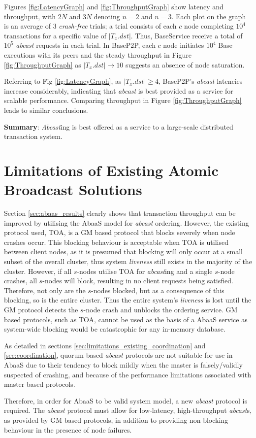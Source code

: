 Figures \ref{fig:LatencyGraph} and \ref{fig:ThroughputGraph} show latency and throughput, with $2N$ and $3N$ denoting $n=2$ and $n=3$. Each plot on the graph is an average of 3 \emph{crash-free} trials; a trial consists of each $c$ node completing $10^4$ transactions for a specific value of $|T_x.dst|$. Thus, BaseService receive a total of $10^5$ \emph{abcast} requests in each trial. In BaseP2P, each $c$ node initiates $10^4$ Base executions with its peers and the steady throughput in Figure \ref{fig:ThroughputGraph} as $|T_x.dst| \rightarrow 10$ suggests an absence of node saturation.

Referring to Fig \ref{fig:LatencyGraph}, as $|T_x.dst| \geq 4$, BaseP2P's \emph{abcast} latencies increase considerably, indicating that \emph{abcast} is best provided as a service for scalable performance. Comparing throughput in Figure \ref{fig:ThroughputGraph} leads to similar conclusions.

\noindent \textbf{Summary}: \emph{Abcast}ing is best offered as a service to a large-scale distributed transaction system. 

\section{Limitations of Existing Atomic Broadcast Solutions}
Section \ref{sec:abaas_results} clearly shows that transaction throughput can be improved by utilising the \textsf{AbaaS} model for \emph{abcast} ordering.  However, the existing protocol used, TOA, is a GM based protocol that blocks severely when node crashes occur.  This blocking behaviour is acceptable when TOA is utilised between client nodes, as it is presumed that blocking will only occur at a small subset of the overall cluster, thus system \emph{liveness} still exists in the majority of the cluster.  However, if all $s$-nodes utilise TOA for \emph{abcast}ing and a single $s$-node crashes, all $s$-nodes will block, resulting in no client requests being satisfied. Therefore, not only are the $s$-nodes blocked, but as a consequence of this blocking, so is the entire cluster.  Thus the entire system's \emph{liveness} is lost until the GM protocol detects the $s$-node crash and unblocks the ordering service.  GM based protocols, such as TOA, cannot be used as the basis of a \textsf{AbaaS} service as system-wide blocking would be catastrophic for any in-memory database.  

As detailed in sections \ref{sec:limitations_existing_coordination} and \ref{sec:coordination}, quorum based \emph{abcast} protocols are not suitable for use in \textsf{AbaaS} due to their tendency to block mildly when the master is falsely/validly suspected of crashing, and because of the performance limitations associated with master based protocols.  

Therefore, in order for \textsf{AbaaS} to be valid system model, a new \emph{abcast} protocol is required.  The \emph{abcast} protocol must allow for low-latency, high-throughput \emph{abcast}s, as provided by GM based protocols, in addition to providing non-blocking behaviour in the presence of node failures.  